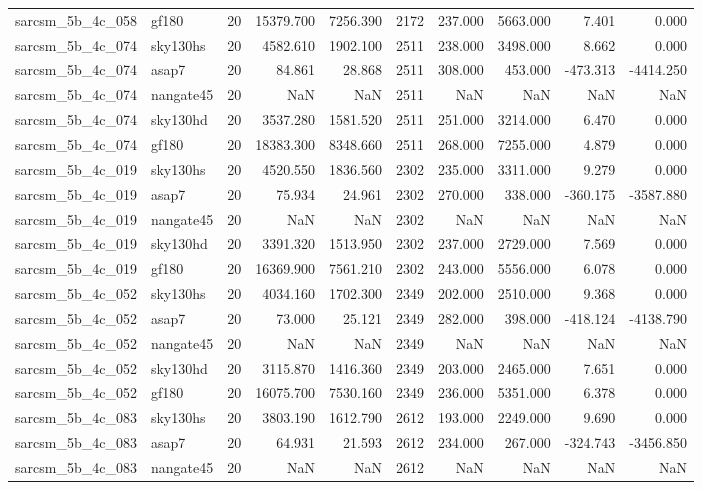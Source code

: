 \documentclass{article}
\begin{document}
\begin{longtable}{llrrrrrrrr}
sarcsm\_5b\_4c\_058 & gf180 & 20 & 15379.700 & 7256.390 & 2172 & 237.000 & 5663.000 & 7.401 & 0.000 \\
sarcsm\_5b\_4c\_074 & sky130hs & 20 & 4582.610 & 1902.100 & 2511 & 238.000 & 3498.000 & 8.662 & 0.000 \\
sarcsm\_5b\_4c\_074 & asap7 & 20 & 84.861 & 28.868 & 2511 & 308.000 & 453.000 & -473.313 & -4414.250 \\
sarcsm\_5b\_4c\_074 & nangate45 & 20 & NaN & NaN & 2511 & NaN & NaN & NaN & NaN \\
sarcsm\_5b\_4c\_074 & sky130hd & 20 & 3537.280 & 1581.520 & 2511 & 251.000 & 3214.000 & 6.470 & 0.000 \\
sarcsm\_5b\_4c\_074 & gf180 & 20 & 18383.300 & 8348.660 & 2511 & 268.000 & 7255.000 & 4.879 & 0.000 \\
sarcsm\_5b\_4c\_019 & sky130hs & 20 & 4520.550 & 1836.560 & 2302 & 235.000 & 3311.000 & 9.279 & 0.000 \\
sarcsm\_5b\_4c\_019 & asap7 & 20 & 75.934 & 24.961 & 2302 & 270.000 & 338.000 & -360.175 & -3587.880 \\
sarcsm\_5b\_4c\_019 & nangate45 & 20 & NaN & NaN & 2302 & NaN & NaN & NaN & NaN \\
sarcsm\_5b\_4c\_019 & sky130hd & 20 & 3391.320 & 1513.950 & 2302 & 237.000 & 2729.000 & 7.569 & 0.000 \\
sarcsm\_5b\_4c\_019 & gf180 & 20 & 16369.900 & 7561.210 & 2302 & 243.000 & 5556.000 & 6.078 & 0.000 \\
sarcsm\_5b\_4c\_052 & sky130hs & 20 & 4034.160 & 1702.300 & 2349 & 202.000 & 2510.000 & 9.368 & 0.000 \\
sarcsm\_5b\_4c\_052 & asap7 & 20 & 73.000 & 25.121 & 2349 & 282.000 & 398.000 & -418.124 & -4138.790 \\
sarcsm\_5b\_4c\_052 & nangate45 & 20 & NaN & NaN & 2349 & NaN & NaN & NaN & NaN \\
sarcsm\_5b\_4c\_052 & sky130hd & 20 & 3115.870 & 1416.360 & 2349 & 203.000 & 2465.000 & 7.651 & 0.000 \\
sarcsm\_5b\_4c\_052 & gf180 & 20 & 16075.700 & 7530.160 & 2349 & 236.000 & 5351.000 & 6.378 & 0.000 \\
sarcsm\_5b\_4c\_083 & sky130hs & 20 & 3803.190 & 1612.790 & 2612 & 193.000 & 2249.000 & 9.690 & 0.000 \\
sarcsm\_5b\_4c\_083 & asap7 & 20 & 64.931 & 21.593 & 2612 & 234.000 & 267.000 & -324.743 & -3456.850 \\
sarcsm\_5b\_4c\_083 & nangate45 & 20 & NaN & NaN & 2612 & NaN & NaN & NaN & NaN \\

\end{longtable}
\end{document}
